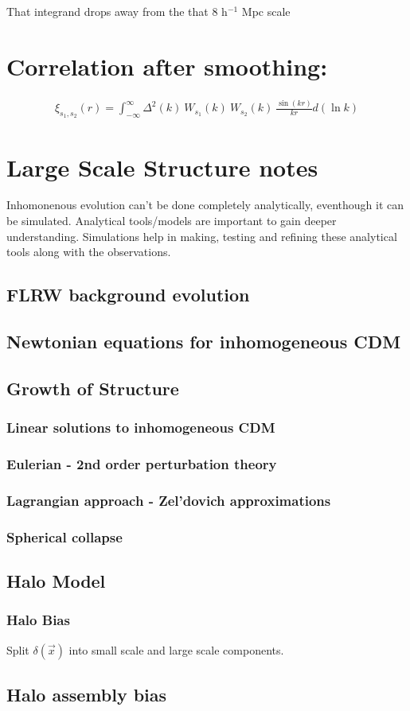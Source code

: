 \documentclass[12pt]{article}
\begin{document}
That integrand drops away from the that 8 h$^{-1}$ Mpc scale

\section{Correlation after smoothing:}

\begin{align}
\xi_{s_1,s_2} (r) = \int_{-\infty}^{\infty} \Delta^2(k) ~W_{s_1}(k) ~W_{s_2}(k) ~\frac{\sin(kr)}{kr} d(\ln k)
\end{align}

\newpage

\section{Large Scale Structure notes}

Inhomonenous evolution can't be done completely analytically, eventhough it can be simulated. Analytical tools/models are important to gain deeper understanding.  Simulations help in making, testing and refining these analytical tools along with the observations.\\

\subsection{FLRW background evolution}

\subsection{Newtonian equations for inhomogeneous CDM}

\subsection{Growth of Structure}

\subsubsection{Linear solutions to inhomogeneous CDM}
\subsubsection{Eulerian - 2nd order perturbation theory}
\subsubsection{Lagrangian approach - Zel'dovich approximations}
\subsubsection{Spherical collapse}

\subsection{Halo Model}
\subsubsection{Halo Bias}
Split $\delta(\vec{x})$ into small scale and large scale components. 

\subsection*{Halo assembly bias}

\newpage
\end{document}
